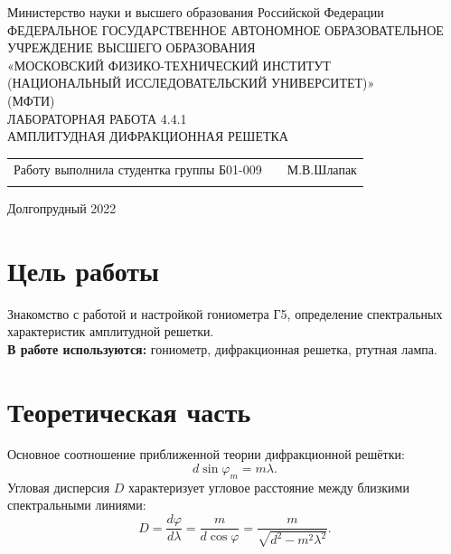 \documentclass[a4paper]{article}
\begin{document}
 
 \begin{titlepage}
\begin{center}
\hfill \break
Министерство науки и высшего образования Российской Федерации\\
ФЕДЕРАЛЬНОЕ ГОСУДАРСТВЕННОЕ АВТОНОМНОЕ ОБРАЗОВАТЕЛЬНОЕ\\ 
УЧРЕЖДЕНИЕ ВЫСШЕГО ОБРАЗОВАНИЯ\\ 
«МОСКОВСКИЙ ФИЗИКО-ТЕХНИЧЕСКИЙ ИНСТИТУТ\\ 
(НАЦИОНАЛЬНЫЙ ИССЛЕДОВАТЕЛЬСКИЙ УНИВЕРСИТЕТ)»\\
(МФТИ)\\
\hfill \break
\hfill \break
\hfill \break
\hfill \break
\hfill \break
\hfill \break
\hfill \break
\hfill \break
\hfill \break
\hfill \break
\hfill \break
ЛАБОРАТОРНАЯ РАБОТА 4.4.1\\
\hfill \break
АМПЛИТУДНАЯ ДИФРАКЦИОННАЯ РЕШЕТКА\\
\end{center}
\hfill \break
\hfill \break
\hfill \break
\hfill \break
\hfill \break
\hfill \break
\hfill \break
\hfill \break
\hfill \break
\hfill \break
\begin{tabular}{ccc}
Работу выполнила студентка группы Б01-009 & & М.В.Шлапак \\\\
\end{tabular}
\hfill \break
\hfill \break
\hfill \break
\hfill \break
\hfill \break
\hfill \break
\hfill \break
\hfill \break
\begin{center} Долгопрудный 2022 \end{center}
\end{titlepage}
\small
{}
\tableofcontents    
\newpage
\section{Цель работы}
Знакомство с работой и настройкой гониометра Г5, определение спектральных характеристик амплитудной решетки.\\

\textbf{В работе используются:}  гониометр, дифракционная решетка, ртутная лампа.
\section{Теоретическая часть}
	\noindent Основное соотношение приближенной теории дифракционной решётки:
	\begin{equation}
	d\sin \varphi_m = m\lambda.
	\end{equation}
	Угловая дисперсия $D$ характеризует угловое расстояние между близкими спектральными линиями:
	\begin{equation}
	D = \frac{d\varphi}{d\lambda} = \frac{m}{d \cos \varphi}=\frac{m}{\sqrt{d^{2}-m^{2} \lambda^{2}}}.
	\end{equation}
	
\end{document}
